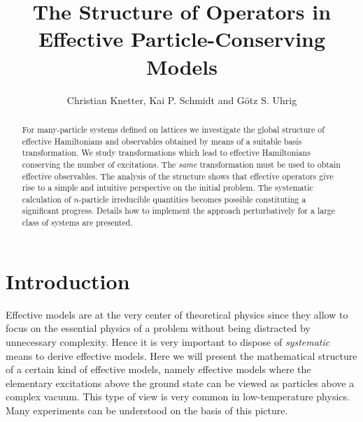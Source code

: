 
\setlength{\unitlength}{1mm}
\tighten



\draft

\title{\bf The Structure of Operators in Effective Particle-Conserving
  Models}  

\author{Christian Knetter, Kai P. Schmidt and G\"otz S. Uhrig}

\address{Institut f\"ur Theoretische Physik, Universit\"at zu
  K\"oln, Z\"ulpicher Str. 77, D-50937 K\"oln, Germany\\[1mm]
  {\rm(\today)} }


\maketitle

\begin{abstract}
For many-particle systems defined on lattices we investigate the
global structure of effective Hamiltonians and observables obtained 
by means of a suitable basis transformation. We study
transformations which lead to effective Hamiltonians conserving the
number of excitations. The {\it same} transformation must be used to
obtain effective observables. The analysis of the structure shows that
effective operators give rise to a simple and intuitive perspective
on the initial problem. The systematic calculation of $n$-particle 
irreducible quantities becomes possible constituting a significant progress.
Details how to implement the approach perturbatively for a large
class of systems are presented.
\end{abstract}



\narrowtext


\section{Introduction}
\label{intro}
Effective models are at the very center of theoretical physics
since they allow to focus on the essential physics of a problem
without being distracted by unnecessary complexity. Hence it is
very important to dispose of {\it systematic} means to derive 
effective models. Here we will present the mathematical structure
 of a certain kind of effective models, namely effective models
where the elementary excitations above the ground state
can be viewed as particles above a complex vacuum. 
This type of view is very common in low-temperature  physics.
Many experiments can be understood on the basis of  this picture.

